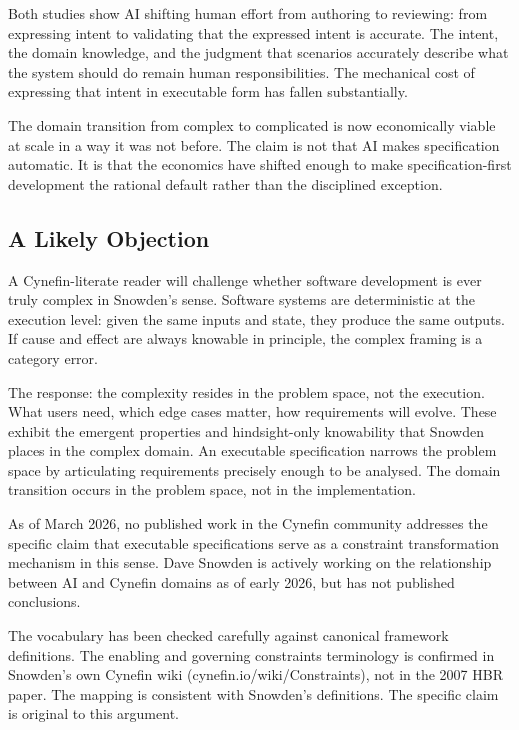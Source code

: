 \documentclass{article}
\begin{document}
Both studies show AI shifting human effort from authoring to reviewing:
from expressing intent to validating that the expressed intent is
accurate. The intent, the domain knowledge, and the judgment that
scenarios accurately describe what the system should do remain human
responsibilities. The mechanical cost of expressing that intent in
executable form has fallen substantially.

The domain transition from complex to complicated is now economically
viable at scale in a way it was not before. The claim is not that AI
makes specification automatic. It is that the economics have shifted
enough to make specification-first development the rational default
rather than the disciplined exception.

\subsection{A Likely Objection}

A Cynefin-literate reader will challenge whether software development is
ever truly complex in Snowden's sense. Software systems are deterministic
at the execution level: given the same inputs and state, they produce the
same outputs. If cause and effect are always knowable in principle, the
complex framing is a category error.

The response: the complexity resides in the problem space, not the
execution. What users need, which edge cases matter, how requirements will
evolve. These exhibit the emergent properties and hindsight-only
knowability that Snowden places in the complex domain. An executable
specification narrows the problem space by articulating requirements
precisely enough to be analysed. The domain transition occurs in the
problem space, not in the implementation.

As of March 2026, no published work in the Cynefin community addresses the specific claim
that executable specifications serve as a constraint transformation
mechanism in this sense. Dave Snowden is actively working on the
relationship between AI and Cynefin domains as of early 2026, but has
not published conclusions.

The vocabulary has been checked carefully
against canonical framework definitions. The enabling and governing
constraints terminology is confirmed in Snowden's own Cynefin wiki
(cynefin.io/wiki/Constraints), not in the 2007 HBR paper. The mapping
is consistent with Snowden's definitions. The specific claim is original
to this argument.
\end{document}
